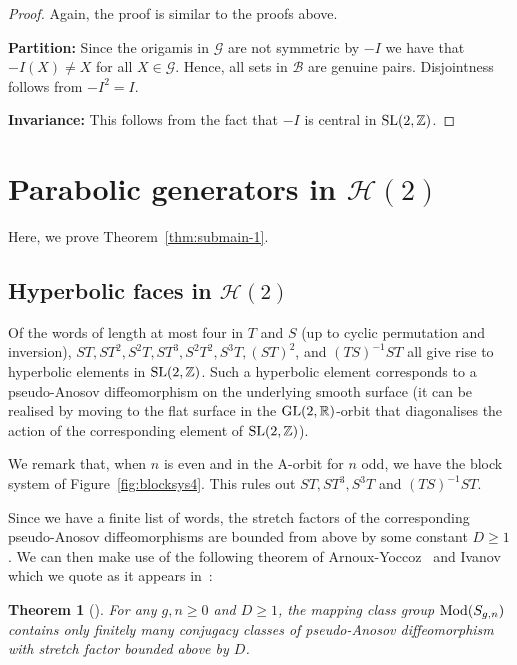 \documentclass[a4paper,11pt]{amsart}
\numberwithin{equation}{section}
\numberwithin{figure}{section}
\numberwithin{table}{section}
\newtheorem{theorem}{Theorem}[section]
\newcommand{\calH}{\mathcal{H}}
\newcommand{\Z}{\mathbb{Z}}
\newcommand{\R}{\mathbb{R}}
\newcommand{\orb}{\mathcal{G}}
\DeclareMathOperator{\SL}{{\rm{SL}}}
\DeclareMathOperator{\GL}{{\rm{GL}}}
\DeclareMathOperator{\Mod}{{\rm{Mod}}}
\begin{document}
\begin{proof}
Again, the proof is similar to the proofs above.

{\bf Partition:} Since the origamis in $\orb$ are not symmetric by $-I$ we have that $-I(X)\neq X$ for all $X\in \orb$. Hence, all sets in $\mathscr{B}$ are genuine pairs. Disjointness follows from $-I^2 = I$.

{\bf Invariance:} This follows from the fact that $-I$ is central in $\SL(2,\Z)$.
\end{proof}


\section{Parabolic generators in $\calH(2)$}\label{sec:T-S-H(2)}

Here, we prove Theorem~\ref{thm:submain-1}.


\subsection{Hyperbolic faces in $\calH(2)$}\label{subsec:hyp-H2}

Of the words of length at most four in $T$ and $S$ (up to cyclic permutation and inversion), $ST, ST^2, S^2T, ST^3, S^2T^2, S^3T, (ST)^2$, and $(TS)^{-1}ST$ all give rise to hyperbolic elements in $\SL(2,\Z)$. Such a hyperbolic element corresponds to a pseudo-Anosov diffeomorphism on the underlying smooth surface (it can be realised by moving to the flat surface in the $\GL(2,\R)$-orbit that diagonalises the action of the corresponding element of $\SL(2,\Z)$).

We remark that, when $n$ is even and in the A-orbit for $n$ odd, we have the block system of Figure~\ref{fig:blocksys4}. This rules out $ST, ST^3, S^3T$ and $(TS)^{-1}ST$.

Since we have a finite list of words, the stretch factors of the corresponding pseudo-Anosov diffeomorphisms are bounded from above by some constant $D\geq1$. We can then make use of the following theorem of Arnoux-Yoccoz~\cite{AY} and Ivanov~\cite{Iva} which we quote as it appears in~\cite{FM}:

\begin{theorem}[{\cite[Theorem 14.9]{FM}}]
    For any $g,n\geq 0$ and $D\geq 1$, the mapping class group $\Mod(S_{g,n})$ contains only finitely many conjugacy classes of pseudo-Anosov diffeomorphism with stretch factor bounded above by $D$.
\end{theorem}
\end{document}
